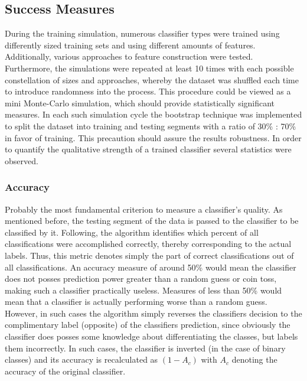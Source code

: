 			
		
			
	\subsection{Success Measures}
		\label{accuracy}
		During the training simulation, numerous classifier types were trained using differently sized training sets and using different amounts of features. Additionally, various approaches to feature construction were tested. Furthermore, the simulations were repeated at least 10 times with each possible constellation of sizes and approaches, whereby the dataset was shuffled each time to introduce randomness into the process. This procedure could be viewed as a mini Monte-Carlo simulation, which should provide statistically significant measures. In each such simulation cycle the bootstrap technique was implemented to split the dataset into training and testing segments with a ratio of 30\% : 70\% in favor of training. This precaution should assure the results robustness. In order to quantify the qualitative strength of a trained classifier several statistics were observed.
		
		\par
	
		\subsubsection{Accuracy}
			Probably the most fundamental criterion to measure a classifier's quality. As mentioned before, the testing segment of the data is passed to the classifier to be classified by it. Following, the algorithm identifies which percent of all classifications were accomplished correctly, thereby corresponding to the actual labels. Thus, this metric denotes simply the part of correct classifications out of all classifications. An accuracy measure of around 50\% would mean the classifier does not posses prediction power greater than a random guess or coin toss, making such a classifier practically useless. Measures of less than 50\% would mean that a classifier is actually performing worse than a random guess. However, in such cases the algorithm simply reverses the classifiers decision to the complimentary label (opposite) of the classifiers prediction, since obviously the classifier does posses some knowledge about differentiating the classes, but labels them incorrectly. In such cases, the classifier is inverted (in the case of binary classes) and its accuracy is recalculated as $ (1-A_c) $ with $ A_c $ denoting the accuracy of the original classifier. 
			
